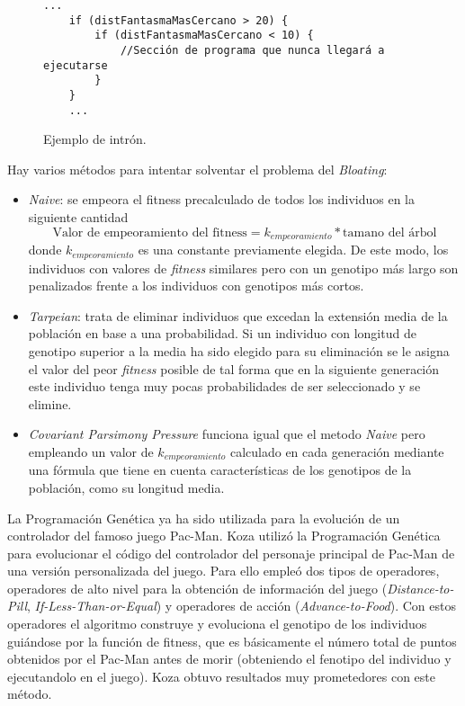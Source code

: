 \begin{figure}[H]
\begin{lstlisting}[frame=single, breaklines=no, basicstyle=\fontsize{10}{11}\ttfamily]
    ...
    if (distFantasmaMasCercano > 20) { 
        if (distFantasmaMasCercano < 10) {
            //Sección de programa que nunca llegará a ejecutarse
        }
    }
    ...
\end{lstlisting}
	\caption{Ejemplo de intrón.}
\end{figure}

Hay varios métodos para intentar solventar el problema del \textit{Bloating}:
\begin{itemize}
\item \textit{Naive}: se empeora el fitness precalculado de todos los individuos en la siguiente cantidad
\begin{equation}
\textrm{Valor de empeoramiento del fitness} = k_{empeoramiento} * \textrm{tamano del árbol}
\end{equation}
donde $k_{empeoramiento}$ es una constante previamente elegida. De este modo, los individuos con valores de \textit{fitness} similares pero con un genotipo más largo son penalizados frente a los individuos con genotipos más cortos.

\item \textit{Tarpeian}: trata de eliminar individuos que excedan la extensión media de la población en base a una probabilidad. Si un individuo con longitud de genotipo superior a la media ha sido elegido para su eliminación se le asigna el valor del peor \textit{fitness} posible de tal forma que en la siguiente generación este individuo tenga muy pocas probabilidades de ser seleccionado y se elimine.

\item \textit{Covariant Parsimony Pressure}\cite{poli2008covariant} funciona igual que el metodo \textit{Naive} pero empleando un valor de $k_{empeoramiento}$ calculado en cada generación mediante una fórmula que tiene en cuenta características de los genotipos de la población, como su longitud media.
\end{itemize}

La Programación Genética ya ha sido utilizada para la evolución de un controlador del famoso juego Pac-Man. Koza\cite{koza1992genetic} utilizó la Programación Genética para evolucionar el código del controlador del personaje principal de Pac-Man de una versión personalizada del juego. Para ello empleó dos tipos de operadores, operadores de alto nivel para la obtención de información del juego (\textit{Distance-to-Pill},
\textit{If-Less-Than-or-Equal}) y operadores de acción (\textit{Advance-to-Food}). Con estos operadores el algoritmo construye y evoluciona el genotipo de los individuos guiándose por la función de fitness, que es básicamente el número total de puntos obtenidos por el Pac-Man antes de morir (obteniendo el fenotipo del individuo y ejecutandolo en el juego). Koza obtuvo resultados muy prometedores con este método.

